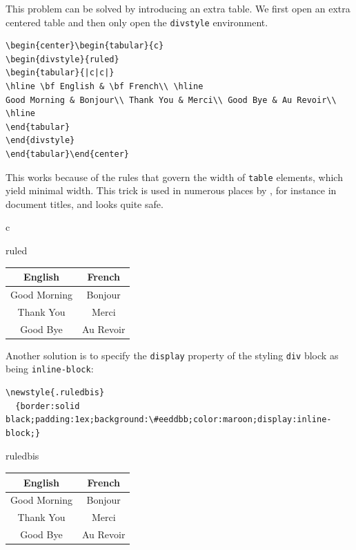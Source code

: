 This problem can be solved by introducing an extra table.
We first open an extra centered table and then only open the
\texttt{divstyle} environment.
\begin{verbatim}
\begin{center}\begin{tabular}{c}
\begin{divstyle}{ruled}
\begin{tabular}{|c|c|}
\hline \bf English & \bf French\\ \hline
Good Morning & Bonjour\\ Thank You & Merci\\ Good Bye & Au Revoir\\
\hline
\end{tabular}
\end{divstyle}
\end{tabular}\end{center}
\end{verbatim}
This works because of the rules that
govern the width of {\html} \verb+table+ elements, which yield
minimal width. This trick is used in
numerous places by \hevea{}, for instance in document titles, and looks
quite safe.
\begin{htmlonly}
\begin{center}\begin{tabular}{c}
\begin{divstyle}{ruled}
\begin{tabular}{|c|c|}
\hline \bf English & \bf French\\ \hline
Good Morning & Bonjour\\ Thank You & Merci\\ Good Bye & Au Revoir\\
\hline
\end{tabular}
\end{divstyle}
\end{tabular}\end{center}
\end{htmlonly}

Another solution is to specify the \texttt{display} property
of the styling \texttt{div} block as being \texttt{inline-block}:
\begin{verbatim}
\newstyle{.ruledbis}
  {border:solid black;padding:1ex;background:\#eeddbb;color:maroon;display:inline-block;}
\end{verbatim}
\begin{htmlonly}
\begin{center}
\begin{divstyle}{ruledbis}
\begin{tabular}{|c|c|}
\hline \bf English & \bf French\\ \hline
Good Morning & Bonjour\\ Thank You & Merci\\ Good Bye & Au Revoir\\
\hline
\end{tabular}
\end{divstyle}
\end{center}
\end{htmlonly}

